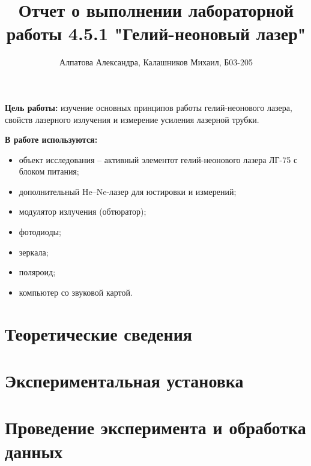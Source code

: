 \documentclass[14pt, a4paper]{report}
\title{\textbf{Отчет о выполнении лабораторной работы 4.5.1 "Гелий-неоновый лазер"}}
\author{Алпатова Александра, Калашников Михаил, Б03-205}
\date{}
\begin{document}
\maketitle

\textbf{Цель работы:}
изучение основных принципов работы гелий-неонового лазера, свойств лазерного излучения и измерение усиления лазерной трубки.
\newline

\textbf{В работе используются:}
\begin{itemize}
\item объект исследования -- активный элементот гелий-неонового лазера ЛГ-75 с блоком питания;
\item дополнительный He–Ne-лазер для юстировки и измерений;
\item модулятор излучения (обтюратор);
\item фотодиоды;
\item зеркала;
\item поляроид;
\item компьютер со звуковой картой.
\end{itemize}

\section{Теоретические сведения}

\section{Экспериментальная установка}

\section{Проведение эксперимента и обработка данных}
\end{document}
